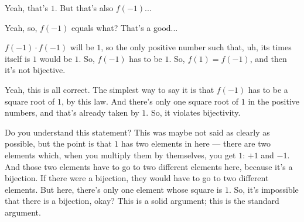 \begin{student}
Yeah, that's $1$. But that's also $f(-1)$...
\end{student}

\begin{speech}[00:16:47 - 00:16:50]
Yeah, so, $f(-1)$ equals what? That's a good... 
\end{speech}

\begin{student}
$f(-1) \cdot f(-1)$ will be $1$, so the only positive number such that, uh, its times itself is $1$ would be $1$. So, $f(-1)$ has to be $1$. So, $f(1) = f(-1)$, and then it's not bijective.
\end{student}

\begin{speech}[00:17:10 - 00:18:00]
Yeah, this is all correct. The simplest way to say it is that $f(-1)$ has to be a square root of $1$,  by this law. And there's only one square root of $1$ in the positive numbers, and that's already taken by $1$. So, it violates bijectivity.

Do you understand this statement? This was maybe not said as clearly as possible, but the point is that $1$ has two elements in here --- there are two elements which, when you multiply them by themselves, you get $1$: $+1$ and $-1$. And those two elements have to go to two different elements here, because it's a bijection. If there were a bijection, they would have to go to two different elements. But here, there's only one element whose square is $1$. So, it's impossible that there is a bijection, okay? This is a solid argument; this is the standard argument.
\end{speech}

